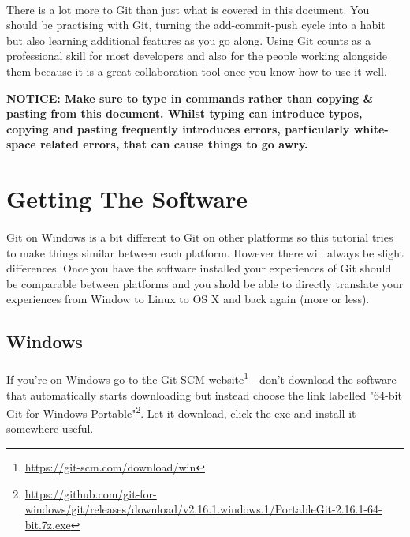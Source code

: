 \documentclass[10pt, a4paper, twosize]{article}
\begin{document}
\paragraph{} There is a lot more to Git than just what is covered in this document. You should be practising with Git, turning the add-commit-push cycle into a habit but also learning additional features as you go along. Using Git counts as a professional skill for most developers and also for the people working alongside them because it is a great collaboration tool once you know how to use it well.

\begin{framed}
{\bf{NOTICE:} Make sure to type in commands rather than copying \& pasting from this document. Whilst typing can introduce typos, copying and pasting frequently introduces errors, particularly white-space related errors, that can cause things to go awry.}
\end{framed}

\section{Getting The Software}
\paragraph{} Git on Windows is a bit different to Git on other platforms so this tutorial tries to make things similar between each platform. However there will always be slight differences. Once you have the software installed your experiences of Git should be comparable between platforms and you shold be able to directly translate your experiences from Window to Linux to OS X and back again (more or less).

\subsection{Windows}
\paragraph{} If you're on Windows go to the Git SCM website\footnote{\url{https://git-scm.com/download/win}}  - don't download the software that automatically starts downloading but instead choose the link labelled "64-bit Git for Windows Portable"\footnote{\url{https://github.com/git-for-windows/git/releases/download/v2.16.1.windows.1/PortableGit-2.16.1-64-bit.7z.exe}}. Let it download, click the exe and install it somewhere useful.
\end{document}
